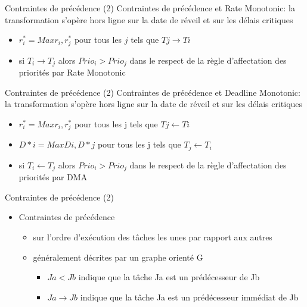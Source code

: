 \begin{frame}{Contraintes de précédence (2)} 
  Contraintes de précédence et Rate Monotonic:
  la transformation s'opère hors ligne sur la date de réveil et sur les délais critiques
  \begin{itemize} 
  \item $r^*_i = Max{r_i, r^*_j}$ pour tous les $j$ tels que $Tj →  Ti$
  \item si $T_i  → T_j$ alors $Prio_i > Prio_j$ dans  le respect de la
    règle d'affectation des priorités par Rate Monotonic
  \end{itemize}
\end{frame} 

\begin{frame}{Contraintes de précédence (2)} 
  Contraintes de  précédence et Deadline  Monotonic: la transformation
  s'opère hors ligne sur la date de réveil et sur les délais critiques
  \begin{itemize}
  \item $r^*_i = Max{r_i, r^*_j}$ pour tous les j tels que $Tj \leftarrow Ti$
  \item $D*i = Max{Di, D*j}$ pour tous les j tels que $T_j \leftarrow  T_i$
  \item  si $T_i  \leftarrow  T_j$  alors $Prio_i  >  Prio_j$ dans  le
    respect de la règle d'affectation des priorités par DMA
  \end{itemize} 
\end{frame} 

\begin{frame}{Contraintes de précédence (2)} 
  \begin{itemize}
  \item Contraintes de précédence 
    \begin{itemize}
    \item sur l'ordre d'exécution des  tâches les unes par rapport aux
      autres
    \item généralement décrites par un graphe orienté G 
      \begin{itemize}
      \item $Ja < Jb$ indique que la tâche Ja est un prédécesseur de Jb 
      \item $Ja → Jb$ indique que la tâche Ja est un prédécesseur immédiat de Jb 
      \end{itemize}
    \end{itemize}
  \end{itemize}
\end{frame}

